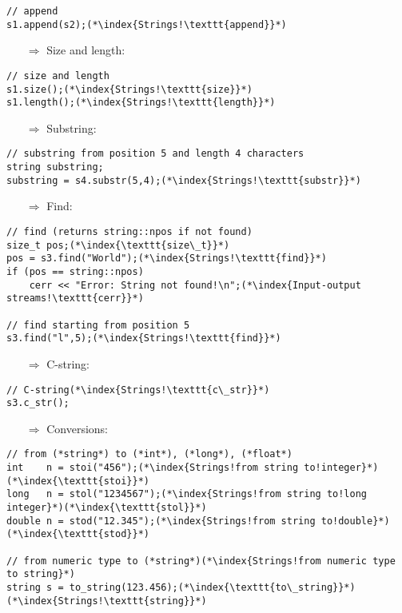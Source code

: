 \documentclass[10pt]{article}
\begin{document}
\begin{lstlisting}
// append
s1.append(s2);(*\index{Strings!\texttt{append}}*)
\end{lstlisting}
\begin{enumerate}
\item[$\Rightarrow$] Size and length:
\end{enumerate}
\begin{lstlisting}
// size and length
s1.size();(*\index{Strings!\texttt{size}}*)
s1.length();(*\index{Strings!\texttt{length}}*)
\end{lstlisting}
\begin{enumerate}
\item[$\Rightarrow$] Substring:
\end{enumerate}
\begin{lstlisting}
// substring from position 5 and length 4 characters
string substring;
substring = s4.substr(5,4);(*\index{Strings!\texttt{substr}}*)
\end{lstlisting}
\begin{enumerate}
\item[$\Rightarrow$] Find:
\end{enumerate}
\begin{lstlisting}
// find (returns string::npos if not found)
size_t pos;(*\index{\texttt{size\_t}}*)
pos = s3.find("World");(*\index{Strings!\texttt{find}}*)
if (pos == string::npos)
    cerr << "Error: String not found!\n";(*\index{Input-output streams!\texttt{cerr}}*)

// find starting from position 5
s3.find("l",5);(*\index{Strings!\texttt{find}}*)
\end{lstlisting}
\begin{enumerate}
\item[$\Rightarrow$] C-string:
\end{enumerate}
\begin{lstlisting}
// C-string(*\index{Strings!\texttt{c\_str}}*)
s3.c_str();
\end{lstlisting}
\begin{enumerate}
\item[$\Rightarrow$] Conversions:
\end{enumerate}
\begin{lstlisting}
// from (*string*) to (*int*), (*long*), (*float*)
int    n = stoi("456");(*\index{Strings!from string to!integer}*)(*\index{\texttt{stoi}}*)
long   n = stol("1234567");(*\index{Strings!from string to!long integer}*)(*\index{\texttt{stol}}*)
double n = stod("12.345");(*\index{Strings!from string to!double}*)(*\index{\texttt{stod}}*)

// from numeric type to (*string*)(*\index{Strings!from numeric type to string}*)
string s = to_string(123.456);(*\index{\texttt{to\_string}}*)(*\index{Strings!\texttt{string}}*)
\end{lstlisting}
%
%
\end{document}
